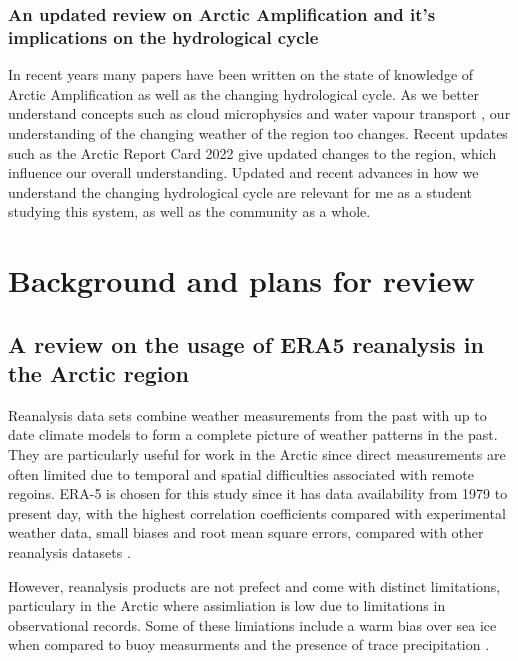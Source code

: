 \documentclass[11pt, oneside]{article}
\begin{document}
\subsubsection{An updated review on Arctic Amplification and it's implications on the hydrological cycle}
In recent years many papers have been written on the state of knowledge of Arctic Amplification \cite{davy2018arctic, previdi2021arctic, vihma2016atmospheric, serreze2011processes} as well as the changing hydrological cycle. As we better understand concepts such as cloud microphysics \cite{pithan2014mixed} and water vapour transport \cite{gimeno2019atmospheric}, our understanding of the changing weather of the region too changes. Recent updates such as the Arctic Report Card 2022 \cite{druckenmiller2022arctic} give updated changes to the region, which influence our overall understanding. Updated and recent advances in how we understand the changing hydrological cycle are relevant for me as a student studying this system, as well as the community as a whole. 


\section{Background and plans for review }
\subsection{A review on the usage of ERA5 reanalysis in the Arctic region}

{\color{blue}{Note that this review will mainly compare and constrast papers which were read in the earlier days of the Polar Climate meeting group (Sping and Summer of 2022) }}

Reanalysis data sets combine weather measurements from the past with up to date climate models to form a complete picture of weather patterns in the past. They are particularly useful for work in the Arctic since direct measurements are often limited due to temporal and spatial difficulties associated with remote regoins. ERA-5 is chosen for this study since it has data availability from 1979 to present day, with the highest correlation coefficients compared with experimental weather data, small biases and root mean square errors, compared with other reanalysis datasets \cite{graham2019improved, hillebrand2021comparison}. 

However, reanalysis products are not prefect and come with distinct limitations, particulary in the Arctic where assimliation is low due to limitations in observational records. Some of these limiations include a warm bias over sea ice when compared to buoy measurments \cite{wang2019comparison} and the presence of trace precipitation \cite{boisvert2018intercomparison}. 
\end{document}
